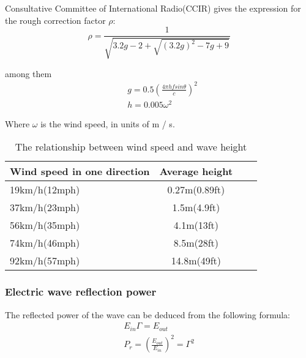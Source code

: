 \documentclass{mcmthesis}
\begin{document}
Consultative Committee of International Radio(CCIR)  gives the expression for the rough correction factor $\rho$\cite{1}:
\begin{equation}
\rho=\frac{1}{\sqrt{3.2g-2+\sqrt{(3.2g)^2-7g+9}}}
\end{equation}

among them
\begin{eqnarray}
&g=0.5(\frac{4\pi{h}fsin\theta}{c})^2\\
&h=0.005\omega^2
\end{eqnarray}

Where $\omega$ is the wind speed, in units of m / s.
\begin{table}[htbp]%
\centering  %
\begin{tabular}{lccc}  %
\hline

Wind speed in one direction &Average height\\ \hline  %
19km/h(12mph) &0.27m(0.89ft) \\         %
37km/h(23mph) &1.5m(4.9ft) \\        %
56km/h(35mph) &4.1m(13ft)\\
74km/h(46mph) &8.5m(28ft)\\
92km/h(57mph) &14.8m(49ft)\\  \hline
\end{tabular}

\caption{The relationship between wind speed and wave height\cite{4}}
\end{table}
\subsubsection{Electric wave reflection power}%
The reflected power of the wave can be deduced from the following formula:
\begin{eqnarray}
E_{in}\Gamma=E_{out}\\
P_r=(\frac{E_{out}}{E_{in}})^2=\Gamma^2
\end{eqnarray}
\end{document}
